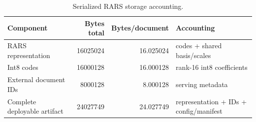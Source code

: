 \begin{table}[t]
\caption{Serialized RARS storage accounting.}
\label{tab:rars-storage}
\begin{tabular}{lrrl}
\toprule
Component & Bytes total & Bytes/document & Accounting \\
\midrule
RARS representation & 16025024 & 16.025024 & codes + shared basis/scales \\
Int8 codes & 16000128 & 16.000128 & rank-16 int8 coefficients \\
External document IDs & 8000128 & 8.000128 & serving metadata \\
Complete deployable artifact & 24027749 & 24.027749 & representation + IDs + config/manifest \\
\bottomrule
\end{tabular}
\end{table}
